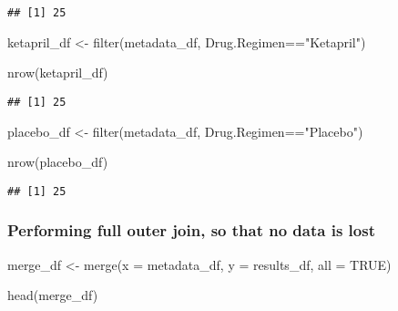 \documentclass[
]{article}
\newenvironment{Shaded}{\begin{snugshade}}{\end{snugshade}}
\newcommand{\AttributeTok}[1]{\textcolor[rgb]{0.77,0.63,0.00}{#1}}
\newcommand{\ConstantTok}[1]{\textcolor[rgb]{0.00,0.00,0.00}{#1}}
\newcommand{\FunctionTok}[1]{\textcolor[rgb]{0.00,0.00,0.00}{#1}}
\newcommand{\NormalTok}[1]{#1}
\newcommand{\OtherTok}[1]{\textcolor[rgb]{0.56,0.35,0.01}{#1}}
\newcommand{\SpecialCharTok}[1]{\textcolor[rgb]{0.00,0.00,0.00}{#1}}
\newcommand{\StringTok}[1]{\textcolor[rgb]{0.31,0.60,0.02}{#1}}
\begin{document}
\begin{verbatim}
## [1] 25
\end{verbatim}

\begin{Shaded}
\begin{Highlighting}[]
\NormalTok{ketapril\_df }\OtherTok{\textless{}{-}} \FunctionTok{filter}\NormalTok{(metadata\_df, Drug.Regimen}\SpecialCharTok{==}\StringTok{"Ketapril"}\NormalTok{)}

\FunctionTok{nrow}\NormalTok{(ketapril\_df)}
\end{Highlighting}
\end{Shaded}

\begin{verbatim}
## [1] 25
\end{verbatim}

\begin{Shaded}
\begin{Highlighting}[]
\NormalTok{placebo\_df }\OtherTok{\textless{}{-}} \FunctionTok{filter}\NormalTok{(metadata\_df, Drug.Regimen}\SpecialCharTok{==}\StringTok{"Placebo"}\NormalTok{)}

\FunctionTok{nrow}\NormalTok{(placebo\_df)}
\end{Highlighting}
\end{Shaded}

\begin{verbatim}
## [1] 25
\end{verbatim}

\hypertarget{performing-full-outer-join-so-that-no-data-is-lost}{%
\subsubsection{Performing full outer join, so that no data is
lost}\label{performing-full-outer-join-so-that-no-data-is-lost}}

\begin{Shaded}
\begin{Highlighting}[]
\NormalTok{merge\_df }\OtherTok{\textless{}{-}} \FunctionTok{merge}\NormalTok{(}\AttributeTok{x =}\NormalTok{ metadata\_df, }\AttributeTok{y =}\NormalTok{ results\_df, }\AttributeTok{all =} \ConstantTok{TRUE}\NormalTok{)}

\FunctionTok{head}\NormalTok{(merge\_df)}
\end{Highlighting}
\end{Shaded}
\end{document}
